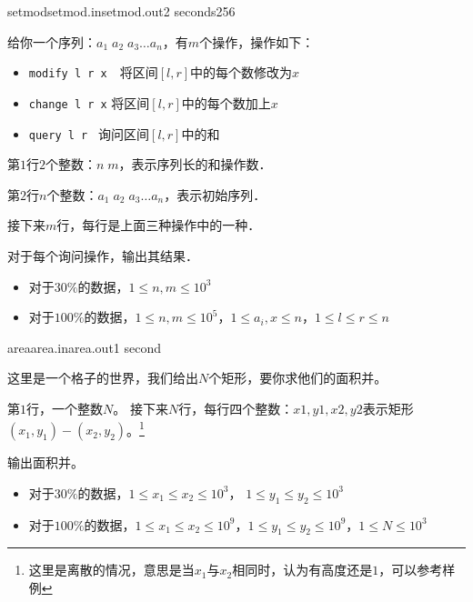 \documentclass[11pt,a4paper,oneside]{article}
\begin{document}
	\begin{problem}{setmod}{setmod.in}{setmod.out}{2 seconds}{256}
		
		给你一个序列：$a_1 \; a_2 \; a_3 \dots  a_n $，有$m$个操作，操作如下：
		
		\begin{itemize}
			\item \texttt{modify l r x}　将区间$[l,r]$中的每个数修改为$x$
			\item \texttt{change l r x} 将区间$[l,r]$中的每个数加上$x$
			\item \texttt{query l r } 询问区间$[l,r]$中的和
		\end{itemize}
		
		\InputFile
		
		第$1$行$2$个整数：$n \; m$，表示序列长的和操作数．
		
		第$2$行$n$个整数：$a_1 \; a_2 \; a_3 \dots a_n$，表示初始序列．
		
		接下来$m$行，每行是上面三种操作中的一种．
		
		\OutputFile
		
		对于每个询问操作，输出其结果．
		
		\Example
		
		\begin{example}
	\end{example}
	
	\Note
	\begin{itemize}
		\item 对于$30\%$的数据，$1 \leq n, m \leq 10^3$
		\item 对于$100\%$的数据，$1 \leq n, m \leq 10^5$，$1 \leq a_i, x \leq n$，$1 \leq l \leq r \leq n$
	\end{itemize}
	
\end{problem}
\begin{problem}{area}{area.in}{area.out}{1 second}
	
	这里是一个格子的世界，我们给出$N$个矩形，要你求他们的面积并。
	
	\InputFile
	
	第$1$行，一个整数$N$。
	接下来$N$行，每行四个整数：$x1,y1,x2,y2$表示矩形$(x_1,y_1)-(x_2,y_2)$。\footnote{这里是离散的情况，意思是当$x_1$与$x_2$相同时，认为有高度还是$1$，可以参考样例}
	
	\OutputFile
	
	输出面积并。
	
	\Example
	
	\begin{example}
		\exmp{
			2
			1 1 2 2
			2 2 3 3
		}{
		7
	}%
\end{example}

\Note
\begin{itemize}
	\item 对于$30\%$的数据，$1 \leq x_1 \leq x_2 \leq 10^3$， $1 \leq y_1 \leq y_2 \leq 10^3$
	\item 对于$100\%$的数据，$1 \leq x_1 \leq x_2 \leq 10^9$，$1 \leq y_1 \leq y_2 \leq 10^9$，$1 \leq N \leq 10^3$
\end{itemize}
\end{problem}
\end{document}
